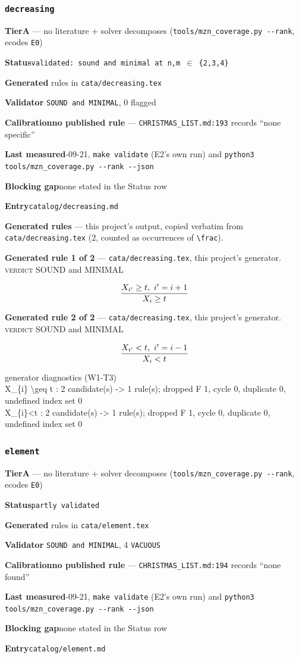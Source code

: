 \documentclass[10pt,a4paper]{article}
\newcommand{\entryfield}[2]{{\raggedright\textbf{#1}\quad #2\par}}
\newcommand{\diag}[1]{{\small\itshape\raggedright #1\par}}
\newcommand{\rulebox}[1]{%
  \[\resizebox{\ifdim\width>\linewidth\linewidth\else\width\fi}{!}%
    {$\displaystyle #1$}\]}
\begin{document}
\subsubsection*{\texttt{decreasing}}
\label{entry:decreasing}
\entryfield{Tier}{\textbf{A} --- no literature + solver decomposes (\texttt{tools/\allowbreak{}mzn\_\allowbreak{}coverage.\allowbreak{}py -\allowbreak{}-\allowbreak{}rank}, ecodes \texttt{E0})}
\entryfield{Status}{\texttt{validated: sound and minimal at n,m $\in$ \{2,3,4\}}}
\entryfield{Generated}{2 rules in \texttt{cata/decreasing.tex}}
\entryfield{Validator}{2 \texttt{SOUND and MINIMAL}, 0 flagged}
\entryfield{Calibration}{\textbf{no published rule} --- \texttt{CHRISTMAS\_LIST.md:193} records ``none specific''}
\entryfield{Last measured}{2026-09-21, \texttt{make validate} (E2's own run) and \texttt{python3 tools/\allowbreak{}mzn\_\allowbreak{}coverage.\allowbreak{}py -\allowbreak{}-\allowbreak{}rank -\allowbreak{}-\allowbreak{}json}}
\entryfield{Blocking gap}{none stated in the Status row}
\entryfield{Entry}{\texttt{catalog/decreasing.md}}

\textbf{Generated rules} --- this project's output, copied verbatim from \texttt{cata/decreasing.tex} (2, counted as occurrences of \texttt{\textbackslash{}frac}).\par

{\small\textbf{Generated rule 1 of 2} --- \texttt{cata/decreasing.tex}, this project's generator. \textsc{verdict} SOUND and MINIMAL\par}
\rulebox{\frac{X_{i'} \geq t,~i'=i+1}{X_{i} \geq t}}

{\small\textbf{Generated rule 2 of 2} --- \texttt{cata/decreasing.tex}, this project's generator. \textsc{verdict} SOUND and MINIMAL\par}
\rulebox{\frac{X_{i'}<t,~i'=i-1}{X_{i}<t}}

\diag{generator diagnostics (W1-T3)\\{} X\_\{i\} \textbackslash{}geq t : 2 candidate(s) -> 1 rule(s); dropped F 1, cycle 0, duplicate 0, undefined index set 0\\{} X\_\{i\}<t : 2 candidate(s) -> 1 rule(s); dropped F 1, cycle 0, duplicate 0, undefined index set 0}
\subsubsection*{\texttt{element}}
\label{entry:element}
\entryfield{Tier}{\textbf{A} --- no literature + solver decomposes (\texttt{tools/\allowbreak{}mzn\_\allowbreak{}coverage.\allowbreak{}py -\allowbreak{}-\allowbreak{}rank}, ecodes \texttt{E0})}
\entryfield{Status}{\texttt{partly validated}}
\entryfield{Generated}{6 rules in \texttt{cata/element.tex}}
\entryfield{Validator}{2 \texttt{SOUND and MINIMAL}, 4 \texttt{VACUOUS}}
\entryfield{Calibration}{\textbf{no published rule} --- \texttt{CHRISTMAS\_LIST.md:194} records ``none found''}
\entryfield{Last measured}{2026-09-21, \texttt{make validate} (E2's own run) and \texttt{python3 tools/\allowbreak{}mzn\_\allowbreak{}coverage.\allowbreak{}py -\allowbreak{}-\allowbreak{}rank -\allowbreak{}-\allowbreak{}json}}
\entryfield{Blocking gap}{none stated in the Status row}
\entryfield{Entry}{\texttt{catalog/element.md}}
\end{document}
